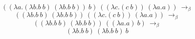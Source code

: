 \documentclass[12pt]{article}
\begin{document}
	$$((\lambda a.(\lambda b.b\ b)\ (\lambda b.b\ b))\ b)\ ((\lambda c.(c\ b))\ (\lambda a.a))\ \to_\beta $$ 
	$$((\lambda b.b\ b)\ (\lambda b.b\ b))\ ((\lambda c.(c\ b))\ (\lambda a.a))\ \to_\beta$$ 
	$$((\lambda b.b\ b)\ (\lambda b.b\ b))\ ((\lambda a.a)\ b)\ \to_\beta $$
	$$(\lambda b.b\ b)\ (\lambda b.b\ b)\ b$$
\end{document}
